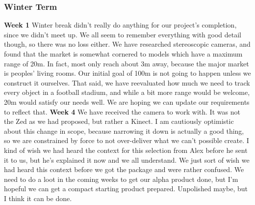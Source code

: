 \documentclass[onecolumn, draftclsnofoot,10pt, compsoc]{IEEEtran}
\begin{document}
\subsubsection{Winter Term}
\textbf{Week 1}
\newline
Winter break didn't really do anything for our project's completion, since we didn't meet up. We all seem to remember everything with good detail though, so there was no loss either.
\newline
We have researched stereoscopic cameras, and found that the market is somewhat cornered to models which have a maximum range of 20m. In fact, most only reach about 3m away, because the major market is peoples' living rooms. Our initial goal of 100m is not going to happen unless we construct it ourselves. That said, we have reevaluated how much we need to track every object in a football stadium, and while a bit more range would be welcome, 20m would satisfy our needs well. We are hoping we can update our requirements to reflect that.
\newline
\textbf{Week 4}
\newline
We have received the camera to work with. It was not the Zed as we had proposed, but rather a Kinect. I am cautiously optimistic about this change in scope, because narrowing it down is actually a good thing, so we are constrained by force to not over-deliver what we can't possible create.
\newline
I kind of wish we had heard the context for this selection from Alex before he sent it to us, but he's explained it now and we all understand. We just sort of wish we had heard this context before we got the package and were rather confused.
\newline
We need to do a loot in the coming weeks to get our alpha product done, but I'm hopeful we can get a compact starting product prepared. Unpolished maybe, but I think it can be done.
\end{document}

